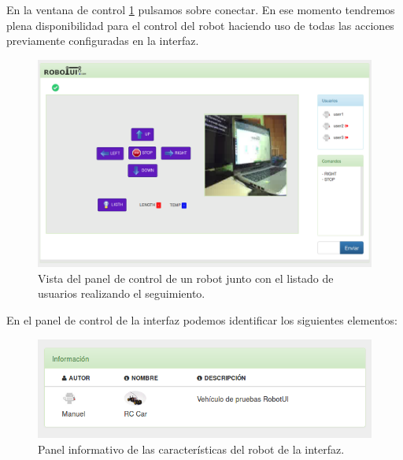 En la ventana de control \ref{website:ventana-control} pulsamos sobre conectar. En ese momento tendremos plena disponibilidad para el control del robot haciendo uso de todas las acciones previamente configuradas en la interfaz.\\

\begin{figure}[H]
  \begin{center}
    \includegraphics[scale=.3]{imagenes/manual-usuario/vista_control.png}
  \end{center}
  \caption{ Vista del panel de control de un robot junto con el listado de usuarios realizando el seguimiento.}
  \label{website:ventana-control}
\end{figure}

En el panel de control de la interfaz podemos identificar los siguientes elementos:

\begin{figure}[H]
  \begin{center}
    \includegraphics[scale=.6]{imagenes/manual-usuario/panel-robot-info.png}
  \end{center}
  \caption{ Panel informativo de las características del robot de la interfaz.}
  \label{website:pagina-principal}
\end{figure}


